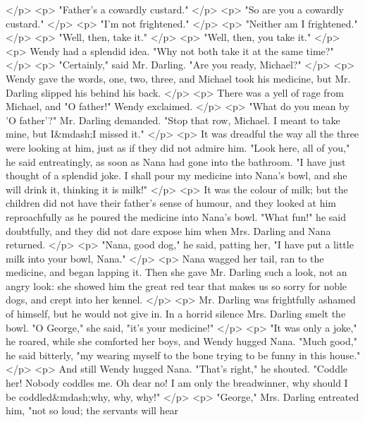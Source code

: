     </p>
    <p>
      "Father's a cowardly custard."
    </p>
    <p>
      "So are you a cowardly custard."
    </p>
    <p>
      "I'm not frightened."
    </p>
    <p>
      "Neither am I frightened."
    </p>
    <p>
      "Well, then, take it."
    </p>
    <p>
      "Well, then, you take it."
    </p>
    <p>
      Wendy had a splendid idea. "Why not both take it at the same time?"
    </p>
    <p>
      "Certainly," said Mr. Darling. "Are you ready, Michael?"
    </p>
    <p>
      Wendy gave the words, one, two, three, and Michael took his medicine, but
      Mr. Darling slipped his behind his back.
    </p>
    <p>
      There was a yell of rage from Michael, and "O father!" Wendy exclaimed.
    </p>
    <p>
      "What do you mean by 'O father'?" Mr. Darling demanded. "Stop that row,
      Michael. I meant to take mine, but I&mdash;I missed it."
    </p>
    <p>
      It was dreadful the way all the three were looking at him, just as if they
      did not admire him. "Look here, all of you," he said entreatingly, as soon
      as Nana had gone into the bathroom. "I have just thought of a splendid
      joke. I shall pour my medicine into Nana's bowl, and she will drink it,
      thinking it is milk!"
    </p>
    <p>
      It was the colour of milk; but the children did not have their father's
      sense of humour, and they looked at him reproachfully as he poured the
      medicine into Nana's bowl. "What fun!" he said doubtfully, and they did
      not dare expose him when Mrs. Darling and Nana returned.
    </p>
    <p>
      "Nana, good dog," he said, patting her, "I have put a little milk into
      your bowl, Nana."
    </p>
    <p>
      Nana wagged her tail, ran to the medicine, and began lapping it. Then she
      gave Mr. Darling such a look, not an angry look: she showed him the great
      red tear that makes us so sorry for noble dogs, and crept into her kennel.
    </p>
    <p>
      Mr. Darling was frightfully ashamed of himself, but he would not give in.
      In a horrid silence Mrs. Darling smelt the bowl. "O George," she said,
      "it's your medicine!"
    </p>
    <p>
      "It was only a joke," he roared, while she comforted her boys, and Wendy
      hugged Nana. "Much good," he said bitterly, "my wearing myself to the bone
      trying to be funny in this house."
    </p>
    <p>
      And still Wendy hugged Nana. "That's right," he shouted. "Coddle her!
      Nobody coddles me. Oh dear no! I am only the breadwinner, why should I be
      coddled&mdash;why, why, why!"
    </p>
    <p>
      "George," Mrs. Darling entreated him, "not so loud; the servants will hear
